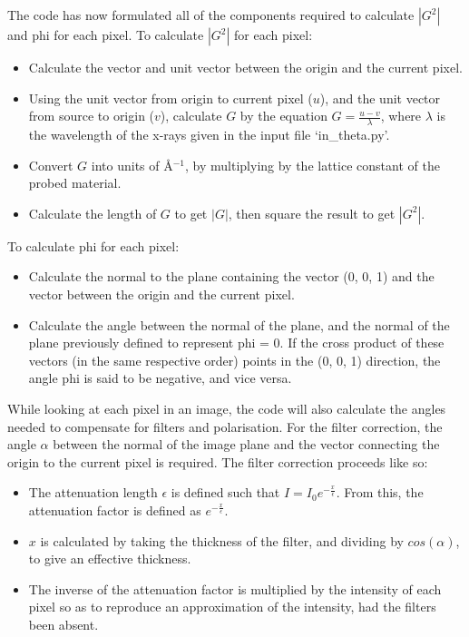 \documentclass{report}
\begin{document}
The code has now formulated all of the components required to calculate $|G^2|$ and phi for each pixel. To calculate $|G^2|$ for each pixel:

\begin{itemize}
\item Calculate the vector and unit vector between the origin and the current pixel.
\item Using the unit vector from origin to current pixel ($u$), and the unit vector from source to origin ($v$), calculate $G$ by the equation $G = \frac{u - v}{\lambda}$, where $\lambda$ is the wavelength of the x-rays given in the input file `in\_theta.py'.
\item Convert $G$ into units of \AA$^{-1}$, by multiplying by the lattice constant of the probed material.
\item Calculate the length of $G$ to get $|G|$, then square the result to get $|G^2|$.
\end{itemize} 

To calculate phi for each pixel:

\begin{itemize}
\item Calculate the normal to the plane containing the vector (0, 0, 1) and the vector between the origin and the current pixel. 
\item Calculate the angle between the normal of the plane, and the normal of the plane previously defined to represent phi = 0. If the cross product of these vectors (in the same respective order) points in the (0, 0, 1) direction, the angle phi is said to be negative, and vice versa.
\end{itemize}

While looking at each pixel in an image, the code will also calculate the angles needed to compensate for filters and polarisation. For the filter correction, the angle $\alpha$ between the normal of the image plane and the vector connecting the origin to the current pixel is required. The filter correction proceeds like so:

\begin{itemize}
\item The attenuation length $\epsilon$ is defined such that $I = I_0 e^{-\frac{x}{\epsilon}}$. From this, the attenuation factor is defined as  $e^{-\frac{x}{\epsilon}}$. 
\item $x$ is calculated by taking the thickness of the filter, and dividing by $cos(\alpha)$, to give an effective thickness.
\item The inverse of the attenuation factor is multiplied by the intensity of each pixel so as to reproduce an approximation of the intensity, had the filters been absent.
\end{itemize}
\end{document}

